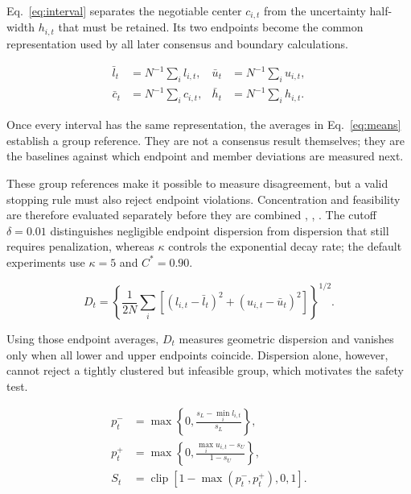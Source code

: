 \documentclass[journal]{IEEEtran}
\newcommand{\clip}{\operatorname{clip}}
\newcommand{\eqnote}[1]{\par\vspace{-0.3ex}\noindent #1\par\vspace{0.4ex}}
\begin{document}
\eqnote{Eq.~\eqref{eq:interval} separates the negotiable center $c_{i,t}$ from the uncertainty half-width $h_{i,t}$ that must be retained. Its two endpoints become the common representation used by all later consensus and boundary calculations.}

\begin{equation}
\begin{aligned}
\bar l_t&=N^{-1}\sum_i l_{i,t}, &
\bar u_t&=N^{-1}\sum_i u_{i,t},\\
\bar c_t&=N^{-1}\sum_i c_{i,t}, &
\bar h_t&=N^{-1}\sum_i h_{i,t}.
\end{aligned}
\label{eq:means}
\end{equation}

\eqnote{Once every interval has the same representation, the averages in Eq.~\eqref{eq:means} establish a group reference. They are not a consensus result themselves; they are the baselines against which endpoint and member deviations are measured next.}

These group references make it possible to measure disagreement, but a valid stopping rule must also reject endpoint violations. Concentration and feasibility are therefore evaluated separately before they are combined \cite{ref6}, \cite{ref21}, \cite{ref27}. The cutoff $\delta=0.01$ distinguishes negligible endpoint dispersion from dispersion that still requires penalization, whereas $\kappa$ controls the exponential decay rate; the default experiments use $\kappa=5$ and $C^*=0.90$.

\begin{equation}
D_t=\left\{\frac{1}{2N}\sum_i\left[
(l_{i,t}-\bar l_t)^2+(u_{i,t}-\bar u_t)^2
\right]\right\}^{1/2}.
\label{eq:dispersion}
\end{equation}

\eqnote{Using those endpoint averages, $D_t$ measures geometric dispersion and vanishes only when all lower and upper endpoints coincide. Dispersion alone, however, cannot reject a tightly clustered but infeasible group, which motivates the safety test.}

\begin{equation}
\begin{aligned}
p_t^-&=\max\left\{0,\frac{s_L-\min_i l_{i,t}}{s_L}\right\},\\
p_t^+&=\max\left\{0,\frac{\max_i u_{i,t}-s_U}{1-s_U}\right\},\\
S_t&=\clip\!\left[1-\max(p_t^-,p_t^+),0,1\right].
\end{aligned}
\label{eq:safety}
\end{equation}
\end{document}
